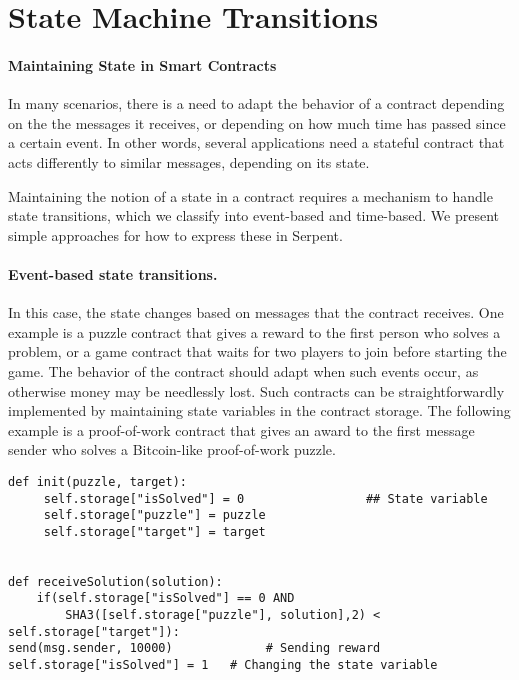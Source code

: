 \documentclass[10pt,twocolumn,letterpaper]{article}
\begin{document}
\section{State Machine Transitions}

\paragraph{Maintaining State in Smart Contracts}

In many scenarios, there is a need to adapt the behavior of a contract depending on the the messages it receives, or depending on how much time has passed since a certain event. In other words, several applications need a stateful contract that acts differently to similar messages, depending on its state.

Maintaining the notion of a state in a contract requires a mechanism to handle state transitions, which we classify into event-based and time-based. We present simple approaches for how to express these in Serpent.

\paragraph{Event-based state transitions.}

In this case, the state changes based on messages that the contract receives. One example is a puzzle contract that gives a reward to the first person who solves a problem, or a game contract that waits for two players to join before starting the game. The behavior of the contract should adapt when such events occur, as otherwise money may be needlessly lost. Such contracts can be straightforwardly implemented by maintaining state variables in the contract storage. The following example is a proof-of-work contract that gives an award to the first message sender who solves a Bitcoin-like proof-of-work puzzle.

\begin{mdframed}
\begin{verbatim}
def init(puzzle, target):
     self.storage["isSolved"] = 0                 ## State variable
     self.storage["puzzle"] = puzzle
     self.storage["target"] = target           
 

def receiveSolution(solution):
    if(self.storage["isSolved"] == 0 AND 
    	SHA3([self.storage["puzzle"], solution],2) < self.storage["target"]):
send(msg.sender, 10000)             # Sending reward
self.storage["isSolved"] = 1   # Changing the state variable
\end{verbatim}
\end{mdframed}
\end{document}
